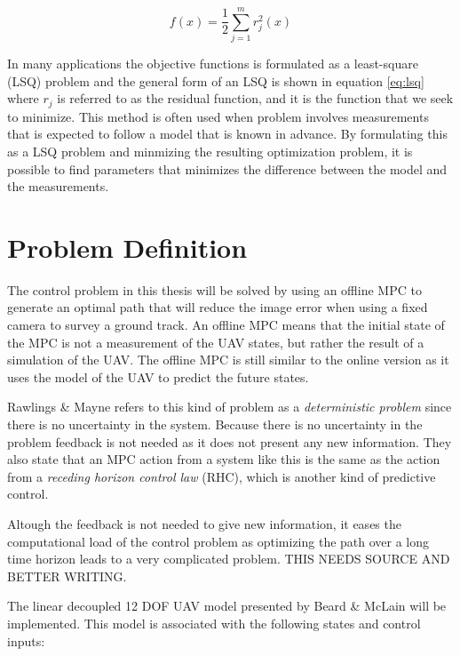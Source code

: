 \begin{equation}
	\label{eq:lsq}
	f(x) = \frac{1}{2} \sum_{j=1}^m r_j^2(x)
\end{equation}

In many applications the objective functions is formulated as a least-square (LSQ) problem and the general form of an LSQ is shown in equation \ref{eq:lsq} \cite{nocedalOPTIMIZATION} where $r_j$ is referred to as the residual function, and it is the function that we seek to minimize. This method is often used when problem involves measurements that is expected to follow a model that is known in advance. By formulating this as a LSQ problem and minmizing the resulting optimization problem, it is possible to find parameters that minimizes the difference between the model and the measurements. 


\section{Problem Definition}

The control problem in this thesis will be solved by using an offline MPC to generate an optimal path that will reduce the image error when using a fixed camera to survey a ground track. An offline MPC means that the initial state of the MPC is not a measurement of the UAV states, but rather the result of a simulation of the UAV. The offline MPC is still similar to the online version as it uses the model of the UAV to predict the future states.

Rawlings \& Mayne \cite{mpcMAYNE} refers to this kind of problem as a \textit{deterministic problem} since there is no uncertainty in the system. Because there is no uncertainty in the problem feedback is not needed as it does not present any new information. They also state that an MPC action from a system like this is the same as the action from a \textit{receding horizon control law} (RHC), which is another kind of predictive control.

Altough the feedback is not needed to give new information, it eases the computational load of the control problem as optimizing the path over a long time horizon leads to a very complicated problem. THIS NEEDS SOURCE AND BETTER WRITING.

The linear decoupled 12 DOF UAV model presented by Beard \& McLain \cite{uavBEARD} will be implemented. This model is associated with the following states and control inputs:

